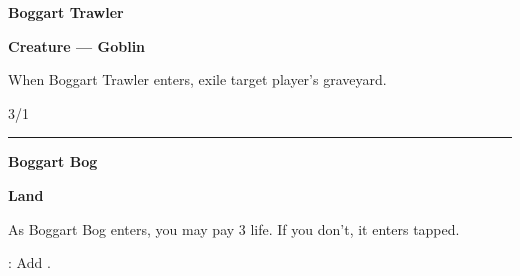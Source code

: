 \documentclass[8pt]{extarticle}
\begin{document}
{\large\textbf{Boggart Trawler}}
\hfill
\2\B

\textbf{Creature — Goblin}

When Boggart Trawler enters, exile target player's graveyard.

\hfill3/1

\vfill
\hrule
\vfill

{\large\textbf{Boggart Bog}}

\textbf{Land}

As Boggart Bog enters, you may pay 3 life. If you don't, it enters tapped.

\T: Add \B.
\end{document}
